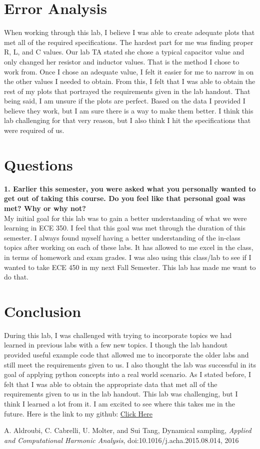 \documentclass[12pt]{report}
\begin{document}
\newpage


\section{Error Analysis}

When working through this lab, I believe I was able to create adequate plots that met all of the required specifications. The hardest part for me was finding proper R, L, and C values. Our lab TA stated she chose a typical capacitor value and only changed her resistor and inductor values. That is the method I chose to work from. Once I chose an adequate value, I felt it easier for me to narrow in on the other values I needed to obtain. From this, I felt that I was able to obtain the rest of my plots that portrayed the requirements given in the lab handout. That being said, I am unsure if the plots are perfect. Based on the data I provided I believe they work, but I am sure there is a way to make them better. I think this lab challenging for that very reason, but I also think I hit the specifications that were required of us.



\section{Questions}

\textbf{1. Earlier this semester, you were asked what you personally wanted to get out of taking this course. Do you feel like that personal goal was met? Why or why not?} \\
{My initial goal for this lab was to gain a better understanding of what we were learning in ECE 350. I feel that this goal was met through the duration of this semester. I always found myself having a better understanding of the in-class topics after working on each of these labs. It has allowed to me excel in the class, in terms of homework and exam grades. I was also using this class/lab to see if I wanted to take ECE 450 in my next Fall Semester. This lab has made me want to do that. }




\section{Conclusion}

During this lab, I was challenged with trying to incorporate topics we had learned in previous labs with a few new topics. I though the lab handout provided useful example code that allowed me to incorporate the older labs and still meet the requirements given to us. I also thought the lab was successful in its goal of applying python concepts into a real world scenario. As I stated before, I felt that I was able to obtain the appropriate data that met all of the requirements given to us in the lab handout. This lab was challenging, but I think I learned a lot from it. I am excited to see where this takes me in the future. Here is the link to my github: \href{https://github.com/JMac1999}{Click Here}




\begin{thebibliography}{111}

A. Aldroubi, C. Cabrelli, U. Molter, and Sui Tang,
Dynamical sampling, 
{\it  Applied and Computational Harmonic Analysis}, doi:10.1016/j.acha.2015.08.014, 2016


\end{thebibliography}
\end{document}
